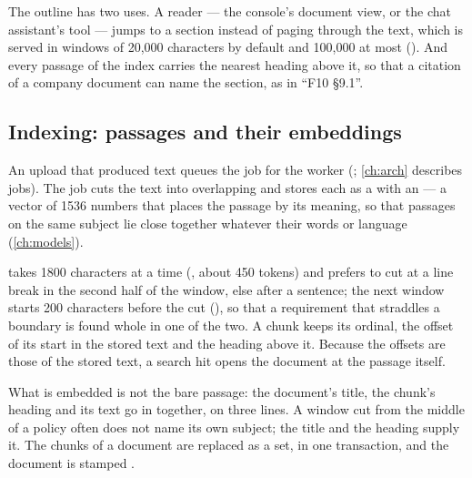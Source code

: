 The outline has two uses. A reader --- the console's document view, or the chat assistant's
 tool --- jumps to a section instead of paging through the text, which is
served in windows of 20,000 characters by default and 100,000 at most
(). And every passage of the index carries the nearest
heading above it, so that a citation of a company document can name the section, as in
\enquote{F10 §9.1}.

\subsection{Indexing: passages and their embeddings}\label{sec:company:indexing}

An upload that produced text queues the job  for the worker
(; \cref{ch:arch} describes jobs). The job cuts the text into
overlapping  and stores each as a  with an  --- a
vector of 1536 numbers that places the passage by its meaning, so that passages on the same
subject lie close together whatever their words or language (\cref{ch:models}).

 takes 1800 characters at a time (, about 450 tokens)
and prefers to cut at a line break in the second half of the window, else after a sentence;
the next window starts 200 characters before the cut (), so that a
requirement that straddles a boundary is found whole in one of the two. A chunk keeps its
ordinal, the offset of its start in the stored text and the heading above it. Because the
offsets are those of the stored text, a search hit opens the document at the passage itself.

What is embedded is not the bare passage: the document's title, the chunk's heading and its
text go in together, on three lines. A window cut from the middle of a policy often does not
name its own subject; the title and the heading supply it. The chunks of a document are
replaced as a set, in one transaction, and the document is stamped .

